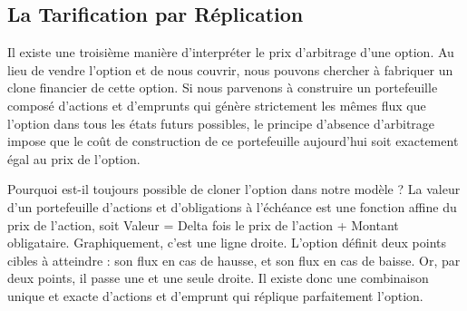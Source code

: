 \subsection{La Tarification par Réplication}

\begin{intuitionbox}
Il existe une troisième manière d'interpréter le prix d'arbitrage d'une option. Au lieu de vendre l'option et de nous couvrir, nous pouvons chercher à fabriquer un clone financier de cette option.
Si nous parvenons à construire un portefeuille composé d'actions et d'emprunts qui génère strictement les mêmes flux que l'option dans tous les états futurs possibles, le principe d'absence d'arbitrage impose que le coût de construction de ce portefeuille aujourd'hui soit exactement égal au prix de l'option.
\end{intuitionbox}

\begin{remarquebox}
Pourquoi est-il toujours possible de cloner l'option dans notre modèle ? 
La valeur d'un portefeuille d'actions et d'obligations à l'échéance est une fonction affine du prix de l'action, soit Valeur = Delta fois le prix de l'action + Montant obligataire. Graphiquement, c'est une ligne droite.
L'option définit deux points cibles à atteindre : son flux en cas de hausse, et son flux en cas de baisse. Or, par deux points, il passe une et une seule droite. Il existe donc une combinaison unique et exacte d'actions et d'emprunt qui réplique parfaitement l'option.
\end{remarquebox}

